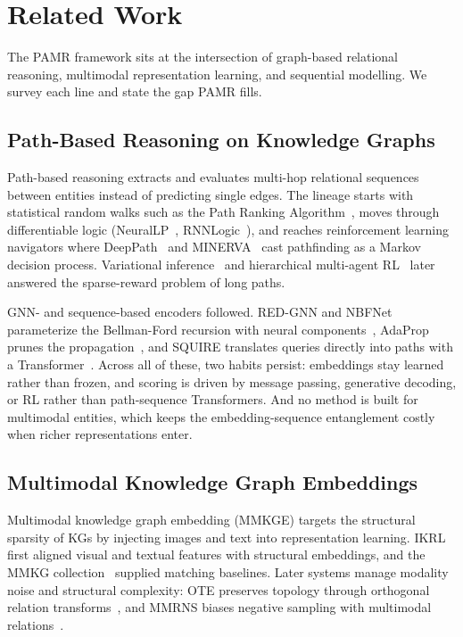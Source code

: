 \documentclass[runningheads]{llncs}
\begin{document}
\section{Related Work}
\label{sec:related-work}

The PAMR framework sits at the intersection of graph-based relational reasoning, multimodal representation learning, and sequential modelling. We survey each line and state the gap PAMR fills.

\subsection{Path-Based Reasoning on Knowledge Graphs}
\label{sec:rw-path-reasoning}

Path-based reasoning extracts and evaluates multi-hop relational sequences between entities instead of predicting single edges. The lineage starts with statistical random walks such as the Path Ranking Algorithm~\cite{lao2011random}, moves through differentiable logic (NeuralLP~\cite{yang2017differentiable}, RNNLogic~\cite{qu2021rnnlogic}), and reaches reinforcement learning navigators where DeepPath~\cite{xiong2017deeppath} and MINERVA~\cite{das2018go} cast pathfinding as a Markov decision process. Variational inference~\cite{chen2018variational} and hierarchical multi-agent RL~\cite{zhang2022learning} later answered the sparse-reward problem of long paths.

GNN- and sequence-based encoders followed. RED-GNN and NBFNet parameterize the Bellman-Ford recursion with neural components~\cite{zhang2022knowledge,zhu2021neural}, AdaProp prunes the propagation~\cite{zhang2023adaprop}, and SQUIRE translates queries directly into paths with a Transformer~\cite{bai2022squire}. Across all of these, two habits persist: embeddings stay learned rather than frozen, and scoring is driven by message passing, generative decoding, or RL rather than path-sequence Transformers. And no method is built for multimodal entities, which keeps the embedding-sequence entanglement costly when richer representations enter.

\subsection{Multimodal Knowledge Graph Embeddings}
\label{sec:rw-mmkge}

Multimodal knowledge graph embedding (MMKGE) targets the structural sparsity of KGs
by injecting images and text into representation learning. IKRL~\cite{xie2017image}
first aligned visual and textual features with structural embeddings, and the MMKG collection~\cite{liu2019mmkg} supplied matching baselines. Later systems manage
modality noise and structural complexity: OTE preserves topology through orthogonal
relation transforms~\cite{tang2020orthogonal}, and MMRNS biases negative sampling with
multimodal relations~\cite{xu2022multimodal}.
\end{document}

